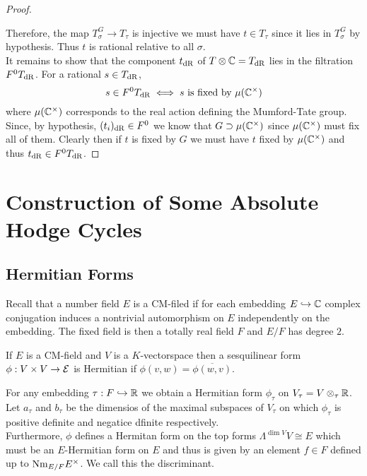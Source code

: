 \documentclass[12pt]{article}
\begin{document}
\begin{proof}
\begin{center}
\end{center}
Therefore, the map $T^G_\sigma \to T_\tau$ is injective we must have $t \in T_\tau$ since it lies in $T^G_\sigma$ by hypothesis. Thus $t$ is rational relative to all $\sigma$.
\bigskip\\
It remains to show that the component $t_{\mathrm{dR}}$ of $T \otimes \mathbb{C} = T_{\mathrm{dR}}$ lies in the filtration $F^0 T_{\mathrm{dR}}$. For a rational $s \in T_{\mathrm{dR}}$,
\[ s \in F^0 T_{\mathrm{dR}} \iff s \text{ is fixed by } \mu(\mathbb{C}^\times) \]
where $\mu(\mathbb{C}^\times)$ corresponds to the real action defining the Mumford-Tate group. Since, by hypothesis, $(t_i)_{\mathrm{dR}} \in F^0$ we know that $G \supset \mu(\mathbb{C}^\times)$ since $\mu(\mathbb{C}^\times)$ must fix all of them. Clearly then if $t$ is fixed by $G$ we must have $t$ fixed by $\mu(\mathbb{C}^\times)$ and thus $t_{\mathrm{dR}} \in F^0 T_{\mathrm{dR}}$. 
\end{proof}

\section{Construction of Some Absolute Hodge Cycles}

\subsection{Hermitian Forms}

\renewcommand{\Tr}{\mathrm{Tr}}

\begin{remark}
Recall that a number field $E$ is a CM-filed if for each embedding $E \hookrightarrow \mathbb{C}$ complex conjugation induces a nontrivial automorphism on $E$ independently on the embedding. The fixed field is then a totally real field $F$ and $E / F$ has degree $2$. 
\end{remark}

\begin{definition}
If $E$ is a CM-field and $V$ is a $K$-vectorspace then a sesquilinear form $\phi : V \times V \to \mathcal{E}$ is Hermitian if $\phi(v,w) = \overline{\phi(w,v)}$. 
\end{definition}

\begin{remark}
For any embedding $\tau : F \hookrightarrow \mathbb{R}$ we obtain a Hermitian form $\phi_\tau$ on $V_\tau = V \otimes_{\tau} \mathbb{R}$. Let $a_\tau$ and $b_\tau$ be the dimensios of the maximal subspaces of $V_\tau$ on which $\phi_\tau$ is positive definite and negatice dfinite respectively. 
\bigskip\\
Furthermore, $\phi$ defines a Hermitan form on the top forms $\Lambda^{\dim{V}} V \cong E$ which must be an $E$-Hermitian form on $E$ and thus is given by an element $f \in F$ defined up to $\mathrm{Nm}_{E/F} E^\times$. We call this the discriminant. 
\end{remark}
\end{document}
